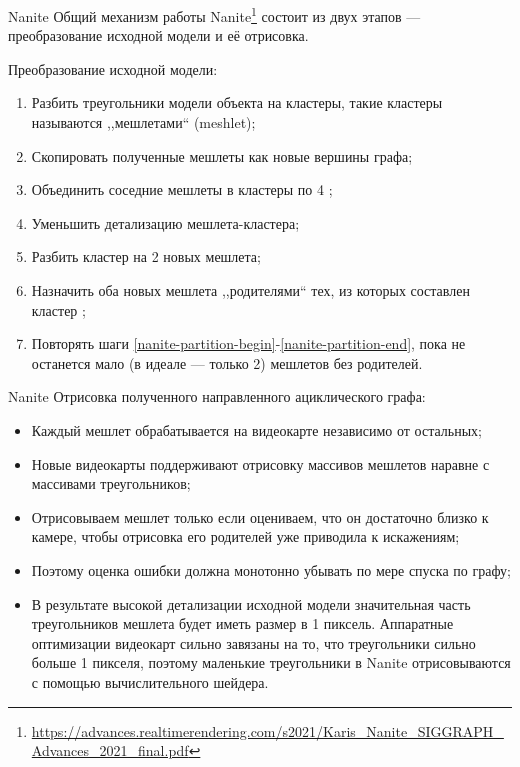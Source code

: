 \documentclass{beamer}
\begin{document}
    \begin{frame}{Nanite}
        Общий механизм работы
        Nanite\footnote{
            \url{https://advances.realtimerendering.com/s2021/Karis_Nanite_SIGGRAPH_Advances_2021_final.pdf}
        } состоит из двух этапов ---
        преобразование исходной модели и её отрисовка.

        Преобразование исходной модели:
        \begin{enumerate}
            \item Разбить треугольники модели объекта на кластеры, такие кластеры называются ,,мешлетами`` (meshlet);
            \item Скопировать полученные мешлеты как новые вершины графа;
            \item Объединить соседние мешлеты в кластеры по 4 \label{nanite-partition-begin};
            \item Уменьшить детализацию мешлета-кластера;
            \item Разбить кластер на 2 новых мешлета;
            \item Назначить оба новых мешлета ,,родителями`` тех, из которых составлен кластер \label{nanite-partition-end};
            \item Повторять шаги \ref{nanite-partition-begin}-\ref{nanite-partition-end},
            пока не останется мало (в идеале --- только 2) мешлетов без родителей.
        \end{enumerate}
    \end{frame}

    \begin{frame}{Nanite}
        Отрисовка полученного направленного ациклического графа:
        \begin{itemize}
            \item Каждый мешлет обрабатывается на видеокарте
            независимо от остальных;
            \item Новые видеокарты поддерживают отрисовку
            массивов мешлетов наравне с массивами треугольников;
            \item Отрисовываем мешлет только если оцениваем,
            что он достаточно близко к камере, чтобы
            отрисовка его родителей уже приводила к искажениям;
            \item Поэтому оценка ошибки должна монотонно
            убывать по мере спуска по графу;
            \item В результате высокой детализации исходной модели
            значительная часть треугольников мешлета будет
            иметь размер в 1 пиксель.
            Аппаратные оптимизации видеокарт сильно завязаны
            на то, что треугольники сильно больше 1 пикселя,
            поэтому маленькие треугольники в Nanite
            отрисовываются с помощью вычислительного шейдера.
        \end{itemize}
    \end{frame}
\end{document}
